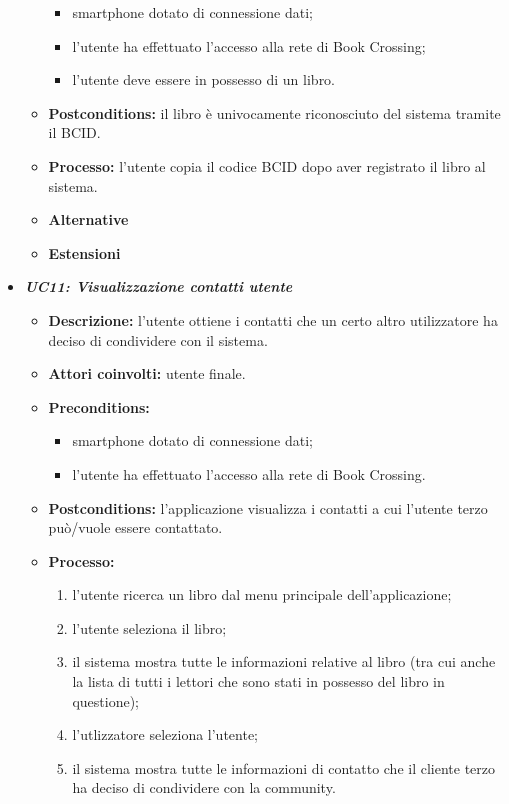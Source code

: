 \begin{itemize}
\begin{itemize}
\begin{itemize}
			\item smartphone dotato di connessione dati;
			\item l’utente ha effettuato l’accesso alla rete di Book Crossing;
			\item l'utente deve essere in possesso di un libro.
		\end{itemize}
		\item \textbf{Postconditions:} il libro è univocamente riconosciuto del sistema tramite il BCID.
		\item \textbf{Processo:} l'utente copia il codice BCID dopo aver registrato il libro al sistema.
		\item \textbf{Alternative}
		\item \textbf{Estensioni}
	\end{itemize}
	\item \textbf{\textit{UC11: Visualizzazione contatti utente}}
	\begin{itemize}
		\item \textbf{Descrizione:} l'utente ottiene i contatti che un certo altro utilizzatore ha deciso di condividere con il sistema.
		\item \textbf{Attori coinvolti:} utente finale.
		\item \textbf{Preconditions:}
		\begin{itemize}
			\item smartphone dotato di connessione dati;
			\item l’utente ha effettuato l’accesso alla rete di Book Crossing.
		\end{itemize}
		\item \textbf{Postconditions:} l'applicazione visualizza i contatti a cui l'utente terzo può/vuole essere contattato.
		\item \textbf{Processo:}
		\begin{enumerate}
			\item l'utente ricerca un libro dal menu principale dell'applicazione;
			\item l'utente seleziona il libro;
			\item il sistema mostra tutte le informazioni relative al libro (tra cui anche la lista di tutti i lettori che sono stati in possesso del libro in questione);
			\item l'utlizzatore seleziona l'utente;
			\item il sistema mostra tutte le informazioni di contatto che il cliente terzo ha deciso di condividere con la community.
		\end{enumerate}

\end{itemize}
\end{itemize}
